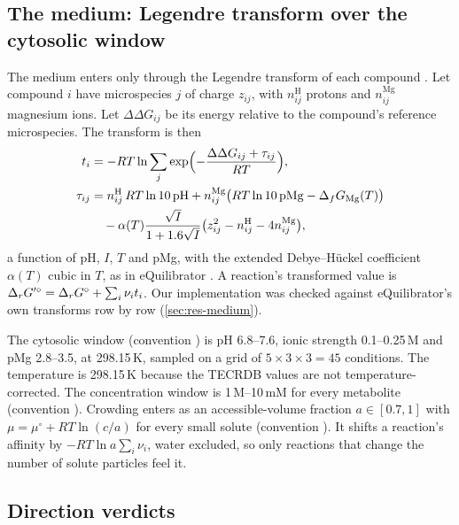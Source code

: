\subsection{The medium: Legendre transform over the cytosolic window}
\label{sec:legendre}

The medium enters only through the Legendre transform of each compound \citep{alberty1998calculation}.
Let compound $i$ have microspecies $j$ of charge $z_{ij}$, with $n^{\mathrm{H}}_{ij}$ protons and $n^{\mathrm{Mg}}_{ij}$ magnesium ions.
Let $\Delta\Delta G_{ij}$ be its energy relative to the compound's reference microspecies.
The transform is then
\begin{align}
  t_i &= -RT\ln\sum_j \exp\Bigl(-\frac{\Delta\Delta G_{ij}+\tau_{ij}}{RT}\Bigr),\\
  \tau_{ij} &= n^{\mathrm{H}}_{ij}\,RT\ln10\,\mathrm{pH} + n^{\mathrm{Mg}}_{ij}\bigl(RT\ln10\,\mathrm{pMg}-\Delta_f G_{\mathrm{Mg}}(T)\bigr)\nonumber\\
  &\quad - \alpha(T)\frac{\sqrt I}{1+1.6\sqrt I}\bigl(z_{ij}^2-n^{\mathrm{H}}_{ij}-4n^{\mathrm{Mg}}_{ij}\bigr),
\end{align}
a function of pH, $I$, $T$ and pMg, with the extended Debye--H\"uckel coefficient $\alpha(T)$ cubic in $T$, as in eQuilibrator \citep{beber2022equilibrator}.
A reaction's transformed value is $\Delta_r G'^\circ=\Delta_r G^\circ+\sum_i\nu_i t_i$.
Our implementation was checked against eQuilibrator's own transforms row by row (\cref{sec:res-medium}).

The cytosolic window (convention ) is pH 6.8--7.6, ionic strength 0.1--0.25\,M and pMg 2.8--3.5, at 298.15\,K, sampled on a grid of $5\times3\times3=45$ conditions.
The temperature is 298.15\,K because the TECRDB values are not temperature-corrected.
The concentration window is 1\,\textmu M--10\,mM for every metabolite (convention ).
Crowding enters as an accessible-volume fraction $a\in[0.7,1]$ with $\mu=\mu^\circ+RT\ln(c/a)$ for every small solute (convention ).
It shifts a reaction's affinity by $-RT\ln a\sum_i\nu_i$, water excluded, so only reactions that change the number of solute particles feel it.

\subsection{Direction verdicts}
\label{sec:direction}

